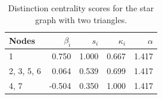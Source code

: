 \begin{table}
\centering
\caption{\label{tab:star2}Distinction centrality scores for the star graph with two triangles.}
\centering
\begin{tabular}[t]{lrrrr}
\toprule
Nodes & $\beta_i$ & $s_i$ & $\kappa_i$ & $\alpha$\\
\midrule
1 & 0.750 & 1.000 & 0.667 & 1.417\\
2, 3, 5, 6 & 0.064 & 0.539 & 0.699 & 1.417\\
4, 7 & -0.504 & 0.350 & 1.000 & 1.417\\
\bottomrule
\end{tabular}
\end{table}
